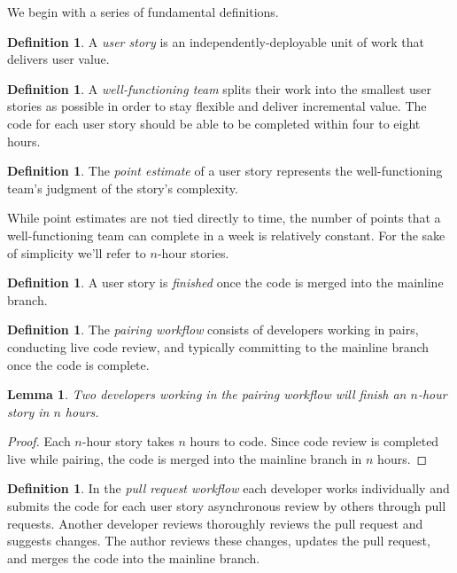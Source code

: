 \documentclass[letterpaper]{article}
\newtheorem{lemma}[theorem]{Lemma}
\theoremstyle{definition}
\newtheorem{definition}[theorem]{Definition}
\begin{document}
    We begin with a series of fundamental definitions.

    \begin{definition}
        A \textit{user story} is an independently-deployable unit of work that delivers user value.
    \end{definition}

    \begin{definition}
        A \textit{well-functioning team} splits their work into the smallest user stories as possible in order to stay
        flexible and deliver incremental value.
        The code for each user story should be able to be completed within four to eight hours.
    \end{definition}

    \begin{definition}
        The \textit{point estimate} of a user story represents the well-functioning team's judgment of the story's
        complexity.
    \end{definition}

    While point estimates are not tied directly to time, the number of points that a well-functioning team can complete
    in a week is relatively constant.
    For the sake of simplicity we'll refer to $n$-hour stories.

    \begin{definition}
        A user story is \textit{finished} once the code is merged into the mainline branch.
    \end{definition}

    \begin{definition}
        The \textit{pairing workflow} consists of developers working in pairs, conducting live code review, and
        typically committing to the mainline branch once the code is complete.
    \end{definition}

    \begin{lemma}
        \label{lemma:pair}
        Two developers working in the pairing workflow will finish an $n$-hour story in $n$ hours.
    \end{lemma}
    \begin{proof}
        Each $n$-hour story takes $n$ hours to code.
        Since code review is completed live while pairing, the code is merged into the mainline branch in $n$ hours.
    \end{proof}

    \begin{definition}
        In the \textit{pull request workflow} each developer works individually and submits the code for each user story
        asynchronous review by others through pull requests.
        Another developer reviews thoroughly reviews the pull request and suggests changes.
        The author reviews these changes, updates the pull request, and merges the code into the mainline branch.
    \end{definition}
\end{document}
